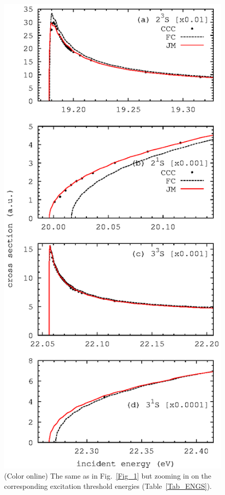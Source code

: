 \documentclass[aip
, pra
, showpacs
, aps
, twocolumn
, groupedaddress
, floatfix
]{revtex4}
\begin{document}
\begin{figure}[htb]
\includegraphics[scale=1]{fig2.ps}
\caption{(Color online)
The same as in Fig.~\ref{Fig_1} but zooming in on the corresponding excitation threshold energies (Table~\ref{Tab_ENGS}).
}
\label{Fig_2}
\end{figure}
\end{document}

